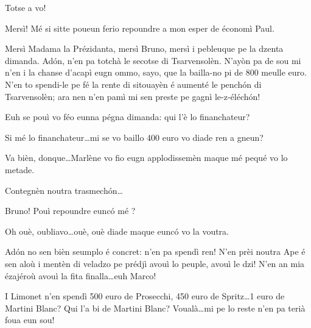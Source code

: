 \begin{drama}

\Brunospeaks {} Totse a vo!

\Presidanspeaks Mersì! Mé si sitte poueun ferio repoundre a mon esper de économì Paul.

\Dallasspeaks {} Mersì Madama la Prézidanta, mersì Bruno, mersì i pebleuque pe la dzenta dimanda. Ad\'on, n'en pa totchà le secotse di Tsarvensolèn. N'ayòn pa de sou mi n'en i la chanse d'acapì eugn ommo, sayo, que la bailla-no pi de 800 meulle euro. N'en to spendi-le pe fé la rente di sitouayèn é aumenté le pench\'on di Tsarvensolèn; ara nen n'en pamì mi sen preste pe gagnì le-z-éléch\'on!

\Brunospeaks Euh se pouì vo féo eunna pégna dimanda: qui l'è lo financhateur?


\Dallasspeaks{} Si mé lo financhateur\ldots mi se vo baillo  400 euro vo diade ren a gneun?


\Brunospeaks Va bièn, donque\ldots Marlène vo fio eugn applodissemèn maque mé pequé vo lo metade.


\Brunospeaks Contegnèn noutra trasmech\'on\ldots

\Jordyspeaks Bruno!  Pouì repoundre eunc\'o mé ?

\Brunospeaks  Oh ouè, oubliavo\ldots ouè, ouè diade maque eunc\'o vo la voutra.

\Jordyspeaks  Ad\'on no sen bièn seumplo é concret: n'en pa spendì ren! N'en prèi noutra Ape é sen aloù i mentèn di veladzo pe prédjì avouì lo peuple, avouì le dzi! N'en an mia ézajéroù avouì la fita finalla\ldots euh Marco!


\Jordyspeaks I Limonet n'en spendì 500 euro de Prosecchi, 450 euro de Spritz\ldots 1 euro de Martini Blanc?  Qui l'a bi de Martini Blanc? Voualà\ldots mi pe lo reste n'en pa terià foua eun sou!


\end{drama}
